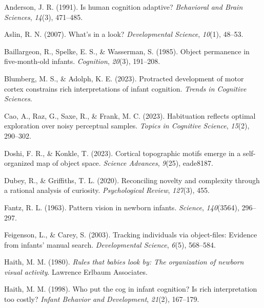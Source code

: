 \documentclass[10pt, letterpaper]{article}
\newenvironment{CSLReferences}%
  {}%
  {\par}
\begin{document}
\hypertarget{refs}{}
\begin{CSLReferences}
\leavevmode{}%
Anderson, J. R. (1991). Is human cognition adaptive? \emph{Behavioral
and Brain Sciences}, \emph{14}(3), 471--485.

\leavevmode{}%
Aslin, R. N. (2007). What's in a look? \emph{Developmental Science},
\emph{10}(1), 48--53.

\leavevmode{}%
Baillargeon, R., Spelke, E. S., \& Wasserman, S. (1985). Object
permanence in five-month-old infants. \emph{Cognition}, \emph{20}(3),
191--208.

\leavevmode{}%
Blumberg, M. S., \& Adolph, K. E. (2023). Protracted development of
motor cortex constrains rich interpretations of infant cognition.
\emph{Trends in Cognitive Sciences}.

\leavevmode{}%
Cao, A., Raz, G., Saxe, R., \& Frank, M. C. (2023). Habituation reflects
optimal exploration over noisy perceptual samples. \emph{Topics in
Cognitive Science}, \emph{15}(2), 290--302.

\leavevmode{}%
Doshi, F. R., \& Konkle, T. (2023). Cortical topographic motifs emerge
in a self-organized map of object space. \emph{Science Advances},
\emph{9}(25), eade8187.

\leavevmode{}%
Dubey, R., \& Griffiths, T. L. (2020). Reconciling novelty and
complexity through a rational analysis of curiosity. \emph{Psychological
Review}, \emph{127}(3), 455.

\leavevmode{}%
Fantz, R. L. (1963). Pattern vision in newborn infants. \emph{Science},
\emph{140}(3564), 296--297.

\leavevmode{}%
Feigenson, L., \& Carey, S. (2003). Tracking individuals via
object-files: Evidence from infants' manual search. \emph{Developmental
Science}, \emph{6}(5), 568--584.

\leavevmode{}%
Haith, M. M. (1980). \emph{Rules that babies look by: The organization
of newborn visual activity}. Lawrence Erlbaum Associates.

\leavevmode{}%
Haith, M. M. (1998). Who put the cog in infant cognition? Is rich
interpretation too costly? \emph{Infant Behavior and Development},
\emph{21}(2), 167--179.


\end{CSLReferences}
\end{document}
